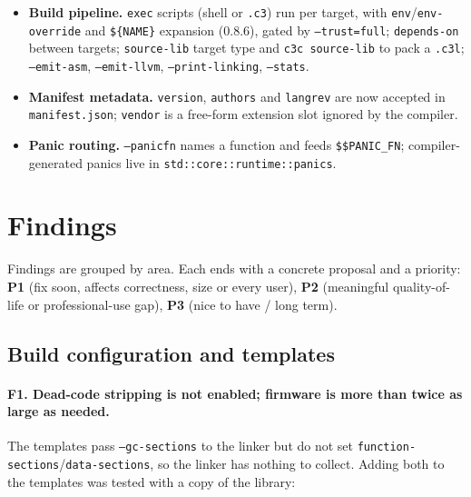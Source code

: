 \documentclass[11pt,a4paper]{article}
\newcommand{\pkg}[1]{\texttt{#1}}
\begin{document}
\begin{itemize}
        \pkg{NO\_LIBC}, \pkg{ARCH\_32\_BIT}, \pkg{MEMORY\_ENV}, \pkg{REGISTER\_SIZE},
        \pkg{COMPILER\_OPT\_LEVEL}, \pkg{SAFE\_MODE}, etc.
  \item \textbf{Build pipeline.} \pkg{exec} scripts (shell or \pkg{.c3}) run per target, with
        \pkg{env}/\pkg{env-override} and \pkg{\$\{NAME\}} expansion (0.8.6), gated by
        \pkg{--trust=full}; \pkg{depends-on} between targets; \pkg{source-lib} target type and
        \pkg{c3c source-lib} to pack a \pkg{.c3l}; \pkg{--emit-asm}, \pkg{--emit-llvm},
        \pkg{--print-linking}, \pkg{--stats}.
  \item \textbf{Manifest metadata.} \pkg{version}, \pkg{authors} and \pkg{langrev} are now accepted
        in \pkg{manifest.json}; \pkg{vendor} is a free-form extension slot ignored by the compiler.
  \item \textbf{Panic routing.} \pkg{--panicfn} names a function and feeds \pkg{\$\$PANIC\_FN};
        compiler-generated panics live in \pkg{std::core::runtime::panics}.
\end{itemize}

\section{Findings}

Findings are grouped by area. Each ends with a concrete proposal and a priority:
\textbf{P1} (fix soon, affects correctness, size or every user),
\textbf{P2} (meaningful quality-of-life or professional-use gap),
\textbf{P3} (nice to have / long term).

\subsection{Build configuration and templates}
\label{sec:build}

\paragraph{F1. Dead-code stripping is not enabled; firmware is more than twice as large as needed.}
The templates pass \pkg{--gc-sections} to the linker but do not set
\pkg{function-sections}/\pkg{data-sections}, so the linker has nothing to collect.
Adding both to the templates was tested with a copy of the library:
\end{document}
